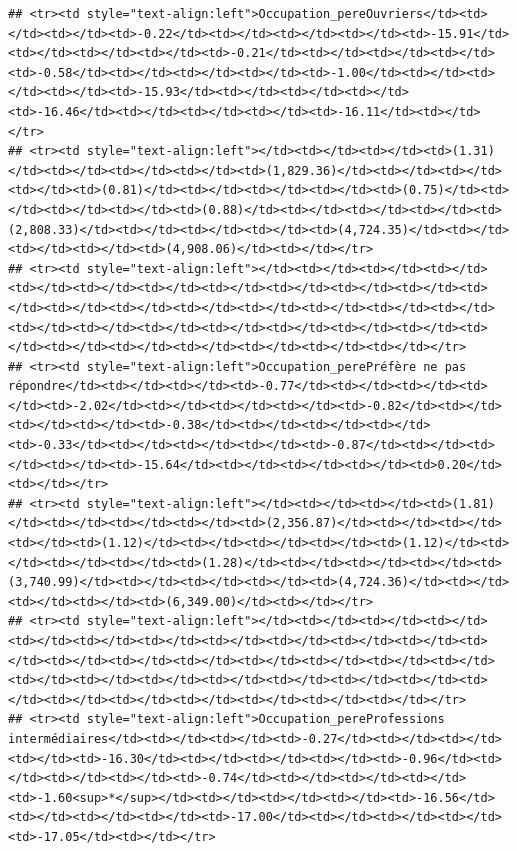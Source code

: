 \documentclass[
]{article}
\begin{document}
\begin{verbatim}
## <tr><td style="text-align:left">Occupation_pereOuvriers</td><td></td><td></td><td>-0.22</td><td></td><td></td><td></td><td>-15.91</td><td></td><td></td><td></td><td>-0.21</td><td></td><td></td><td></td><td>-0.58</td><td></td><td></td><td></td><td>-1.00</td><td></td><td></td><td></td><td>-15.93</td><td></td><td></td><td></td><td>-16.46</td><td></td><td></td><td></td><td>-16.11</td><td></td></tr>
## <tr><td style="text-align:left"></td><td></td><td></td><td>(1.31)</td><td></td><td></td><td></td><td>(1,829.36)</td><td></td><td></td><td></td><td>(0.81)</td><td></td><td></td><td></td><td>(0.75)</td><td></td><td></td><td></td><td>(0.88)</td><td></td><td></td><td></td><td>(2,808.33)</td><td></td><td></td><td></td><td>(4,724.35)</td><td></td><td></td><td></td><td>(4,908.06)</td><td></td></tr>
## <tr><td style="text-align:left"></td><td></td><td></td><td></td><td></td><td></td><td></td><td></td><td></td><td></td><td></td><td></td><td></td><td></td><td></td><td></td><td></td><td></td><td></td><td></td><td></td><td></td><td></td><td></td><td></td><td></td><td></td><td></td><td></td><td></td><td></td><td></td><td></td></tr>
## <tr><td style="text-align:left">Occupation_perePréfère ne pas répondre</td><td></td><td></td><td>-0.77</td><td></td><td></td><td></td><td>-2.02</td><td></td><td></td><td></td><td>-0.82</td><td></td><td></td><td></td><td>-0.38</td><td></td><td></td><td></td><td>-0.33</td><td></td><td></td><td></td><td>-0.87</td><td></td><td></td><td></td><td>-15.64</td><td></td><td></td><td></td><td>0.20</td><td></td></tr>
## <tr><td style="text-align:left"></td><td></td><td></td><td>(1.81)</td><td></td><td></td><td></td><td>(2,356.87)</td><td></td><td></td><td></td><td>(1.12)</td><td></td><td></td><td></td><td>(1.12)</td><td></td><td></td><td></td><td>(1.28)</td><td></td><td></td><td></td><td>(3,740.99)</td><td></td><td></td><td></td><td>(4,724.36)</td><td></td><td></td><td></td><td>(6,349.00)</td><td></td></tr>
## <tr><td style="text-align:left"></td><td></td><td></td><td></td><td></td><td></td><td></td><td></td><td></td><td></td><td></td><td></td><td></td><td></td><td></td><td></td><td></td><td></td><td></td><td></td><td></td><td></td><td></td><td></td><td></td><td></td><td></td><td></td><td></td><td></td><td></td><td></td><td></td></tr>
## <tr><td style="text-align:left">Occupation_pereProfessions intermédiaires</td><td></td><td></td><td>-0.27</td><td></td><td></td><td></td><td>-16.30</td><td></td><td></td><td></td><td>-0.96</td><td></td><td></td><td></td><td>-0.74</td><td></td><td></td><td></td><td>-1.60<sup>*</sup></td><td></td><td></td><td></td><td>-16.56</td><td></td><td></td><td></td><td>-17.00</td><td></td><td></td><td></td><td>-17.05</td><td></td></tr>

\end{verbatim}
\end{document}
